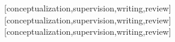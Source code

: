 \documentclass[spanish]{textolivre}
\begin{document}
\printbibliography\label{sec-bib}
\begin{contributors}
[conceptualization,supervision,writing,review]
[conceptualization,supervision,writing,review]
[conceptualization,supervision,writing,review]
\end{contributors}
\end{document}
